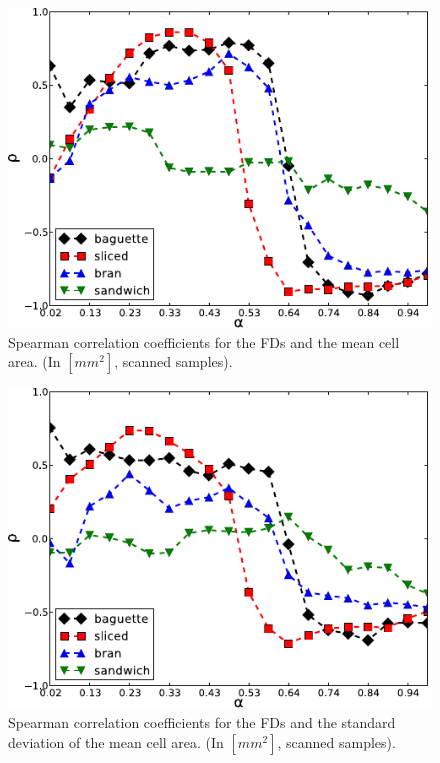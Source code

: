 \documentclass[spanish,a4paper,openright,11pt]{book}
\begin{document}
\begin{figure}[h!]
\centering
\includegraphics{MCA}
\caption{Spearman correlation coefficients for the FDs and the mean cell area. (In $[mm^{2}]$, scanned samples).}
\label{fig:corrMCA}
\end{figure}

\begin{figure}[h!]
\centering
\includegraphics{stMCA}
\caption{Spearman correlation coefficients for the FDs and the standard deviation of the mean cell area. (In $[mm^{2}]$, scanned samples).}
\label{fig:corrMCAstdev}
\end{figure}
\end{document}
